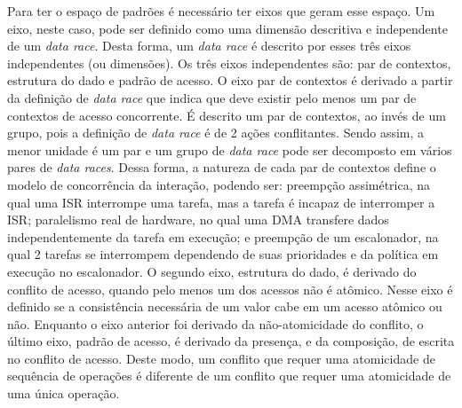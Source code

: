 Para ter o espaço de padrões é necessário ter eixos que geram esse espaço. Um eixo, neste caso, pode ser definido como uma dimensão descritiva e independente de um \textit{data race}. Desta forma, um \textit{data race} é descrito por esses três eixos independentes (ou dimensões). Os três eixos independentes são: par de contextos, estrutura do dado e padrão de acesso. O eixo par de contextos é derivado a partir da definição de \textit{data race} que indica que deve existir pelo menos um par de contextos de acesso concorrente. É descrito um par de contextos, ao invés de um grupo, pois a definição de \textit{data race} é de 2 ações conflitantes. Sendo assim, a menor unidade é um par e um grupo de \textit{data race} pode ser decomposto em vários pares de \textit{data races}. Dessa forma, a natureza de cada par de contextos define o modelo de concorrência da interação, podendo ser: preempção assimétrica, na qual uma \ac{ISR} interrompe uma tarefa, mas a tarefa é incapaz de interromper a \ac{ISR}; paralelismo real de hardware, no qual uma \ac{DMA} transfere dados independentemente da tarefa em execução; e preempção de um escalonador, na qual 2 tarefas se interrompem dependendo de suas prioridades e da política em execução no escalonador. O segundo eixo, estrutura do dado, é derivado do conflito de acesso, quando pelo menos um dos acessos não é atômico. Nesse eixo é definido se a consistência necessária de um valor cabe em um acesso atômico ou não. Enquanto o eixo anterior foi derivado da não-atomicidade do conflito, o último eixo, padrão de acesso, é derivado da presença, e da composição, de escrita no conflito de acesso. Deste modo, um conflito que requer uma atomicidade de sequência de operações é diferente de um conflito que requer uma atomicidade de uma única operação.


